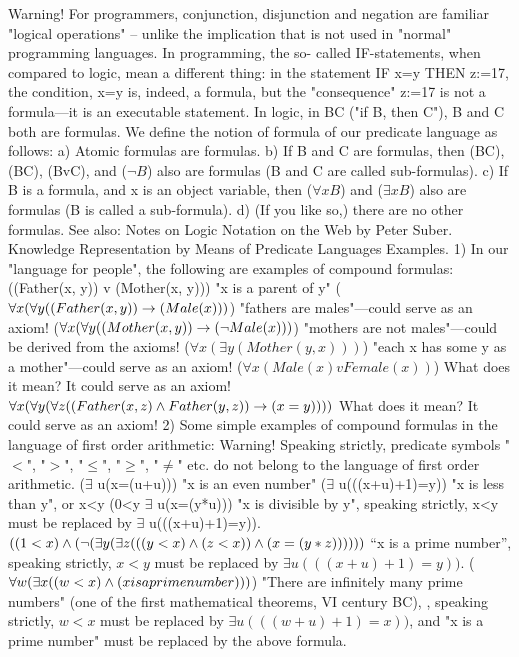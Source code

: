 Warning! For programmers, conjunction, disjunction and negation are familiar "logical operations" –
unlike the implication that is not used in "normal" programming languages. In programming, the so-
called IF-statements, when compared to logic, mean a different thing: in the statement IF x=y THEN
z:=17, the condition, x=y is, indeed, a formula, but the "consequence" z:=17 is not a formula---it is an
executable statement. In logic, in B\IMPLIES C ("if B, then C"), B and C both are formulas.
We define the notion of formula of our predicate language as follows:
a) Atomic formulas are formulas.
b) If B and C are formulas, then (B\IMPLIES C), (B\AND C), (BvC), and (\(\neg B\)) also are formulas (B and C are called
sub-formulas).
c) If B is a formula, and x is an object variable, then (\(\forall xB\)) and (\(\exists xB\)) also are formulas (B is called a
sub-formula).
d) (If you like so,) there are no other formulas.
See also:
Notes on Logic Notation on the Web by Peter Suber.
Knowledge Representation by Means of Predicate Languages
Examples. 1) In our "language for people", the following are examples of compound formulas:
((Father(x, y)) v (Mother(x, y))) "x is a parent of y"
(\(\forall x(\forall y((Father(x, y)) \rightarrow  (Male(x)))\)) "fathers are males"---could serve as an axiom!
(\(\forall x(\forall y((Mother(x, y)) \rightarrow  (\neg Male(x)))\)) "mothers are not males"---could be derived from the axioms!
(\(\forall x(\exists y(Mother(y, x)))\)) "each x has some y as a mother"---could serve as an axiom!
(\(\forall x(Male(x) v Female(x))\)) What does it mean? It could serve as an axiom!
\(\forall x(\forall y(\forall z((Father(x, z)\wedge Father(y,z))\rightarrow (x=y))))\) What does it mean? It could serve as an axiom!
2) Some simple examples of compound formulas in the language of first order arithmetic:
Warning! Speaking strictly, predicate symbols "\(<\)", "\(>\)", "\(\leq\)", "\(\geq\)", "\(\ne\)" etc. do not belong to the language of first order
arithmetic.
(\(\exists\) u(x=(u+u))) "x is an even number"
(\(\exists\) u(((x+u)+1)=y)) "x is less than y", or x<y
(0<y \AND  \(\exists\) u(x=(y*u))) "x is divisible by y", speaking strictly, x<y must be replaced by \(\exists\) u(((x+u)+1)=y)).
\(((1<x)\wedge (\neg (\exists y(\exists z(((y<x)\wedge (z<x))\wedge (x=(y*z))))))\) ``x is a prime number'', speaking strictly, \(x<y\) must be replaced by \(\exists u(((x+u)+1)=y))\).
(\(\forall w(\exists x((w<x)\wedge (x is a prime number)))\)) "There are infinitely many prime numbers" (one of the first mathematical theorems, VI century BC), , speaking strictly, \(w<x\) must be replaced by \(\exists u(((w+u)+1)=x))\), and "x is a prime number" must be replaced by the above formula.
